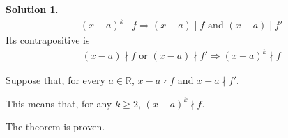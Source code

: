 \documentclass[12pt]{article}
\theoremstyle{definition}
\newtheorem*{soln}{Solution}
\newcommand{\RR}{{\mathbb{R}}}
\begin{document}
\begin{soln}
\renewcommand{\land}{\text{ and }}
\renewcommand{\lor}{\text{ or }}

\begin{gather*}
(x-a)^k\mid f \Longrightarrow (x-a)\mid f\land (x-a)\mid f'
\end{gather*}
Its contrapositive is
\begin{gather*}
(x-a)\nmid f\lor (x-a)\nmid f' \Longrightarrow (x-a)^k\nmid f
\end{gather*}

Suppose that, for every $a\in \RR$, $x-a\nmid f$ and $x-a\nmid f'$.

This means that, for any $k\geq 2$, $(x-a)^k\nmid f$.

The theorem is proven.

\end{soln}
\end{document}
